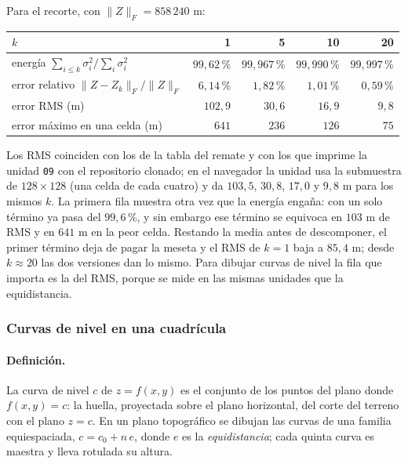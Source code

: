 Para el recorte, con \(\|Z\|_F=858\,240\) m:

{\small
\begin{center}
\begin{tabular}{l rrrr}
\toprule
\(k\) & 1 & 5 & 10 & 20\\
\midrule
energía \(\sum_{i\le k}\sigma_i^2/\sum_i\sigma_i^2\) & \(99{,}62\)\,\% & \(99{,}967\)\,\% & \(99{,}990\)\,\% & \(99{,}997\)\,\%\\
error relativo \(\|Z-Z_k\|_F/\|Z\|_F\) & \(6{,}14\)\,\% & \(1{,}82\)\,\% & \(1{,}01\)\,\% & \(0{,}59\)\,\%\\
error RMS (m) & \(102{,}9\) & \(30{,}6\) & \(16{,}9\) & \(9{,}8\)\\
error máximo en una celda (m) & \(641\) & \(236\) & \(126\) & \(75\)\\
\bottomrule
\end{tabular}
\end{center}
}

Los RMS coinciden con los de la tabla del remate y con los que imprime la unidad
\texttt{09} con el repositorio clonado; en el navegador la unidad usa la submuestra de
\(128\times128\) (una celda de cada cuatro) y da \(103{,}5\), \(30{,}8\), \(17{,}0\) y
\(9{,}8\) m para los mismos \(k\). La primera fila muestra otra vez que la energía engaña: con
un solo término ya pasa del \(99{,}6\)\,\%, y sin embargo ese término se equivoca en \(103\) m
de RMS y en \(641\) m en la peor celda. Restando la media antes de descomponer, el primer
término deja de pagar la meseta y el RMS de \(k=1\) baja a \(85{,}4\) m; desde \(k\approx20\)
las dos versiones dan lo mismo. Para dibujar curvas de nivel la fila que importa es la del
RMS, porque se mide en las mismas unidades que la equidistancia.

\subsubsection{Curvas de nivel en una cuadrícula}\label{sec:svd-dem-curvas}

\paragraph{Definición.} La curva de nivel \(c\) de \(z=f(x,y)\) es el conjunto de los puntos
del plano donde \(f(x,y)=c\): la huella, proyectada sobre el plano horizontal, del corte del
terreno con el plano \(z=c\). En un plano topográfico se dibujan las curvas de una familia
equiespaciada, \(c=c_0+n\,e\), donde \(e\) es la \emph{equidistancia}; cada quinta curva es
maestra y lleva rotulada su altura.

